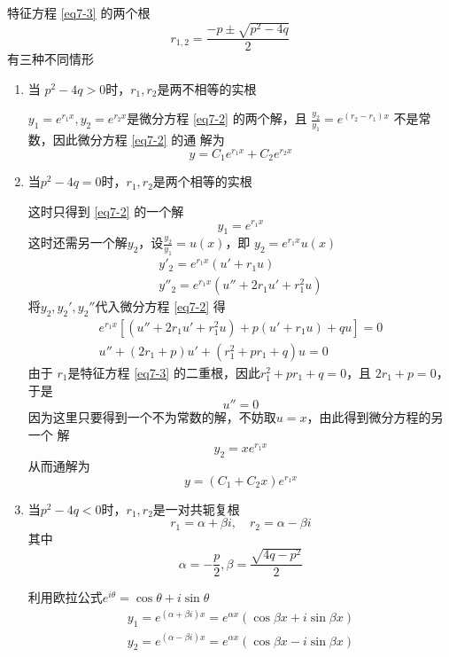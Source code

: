 \documentclass[11pt]{article}
\begin{document}
特征方程 \eqref{eq7-3} 的两个根
\begin{equation*}
r_{1,2}=\frac{-p\pm\sqrt{p^2-4q}}{2}
\end{equation*}
有三种不同情形
\begin{enumerate}
\item 当 \(p^2-4q>0\)时，\(r_1,r_2\)是两不相等的实根

\(y_1=e^{r_1x},y_2=e^{r_2x}\)是微分方程 \eqref{eq7-2} 的两个解，且
\(\frac{y_2}{y_1}=e^{(r_2-r_1)x}\) 不是常数，因此微分方程 \eqref{eq7-2} 的通
解为
\begin{equation*}
y=C_1e^{r_1x}+C_2e^{r_2x}
\end{equation*}
\item 当\(p^2-4q=0\)时，\(r_1,r_2\)是两个相等的实根

这时只得到 \eqref{eq7-2} 的一个解
\begin{equation*}
y_1=e^{r_1x}
\end{equation*}
这时还需另一个解\(y_2\)，设\(\frac{y_2}{y_1}=u(x)\)，即
\(y_2=e^{r_1x}u(x)\)
\begin{gather*}
y'_2=e^{r_1x}(u'+r_1u)\\
y''_2=e^{r_1x}(u''+2r_1u'+r_1^2u)
\end{gather*}
将\(y_2,y_2',y_2''\)代入微分方程 \eqref{eq7-2} 得
\begin{gather*}
e^{r_1x}[(u''+2r_1u'+r_1^2u)+p(u'+r_1u)+qu]=0\\
u''+(2r_1+p)u'+(r_1^2+pr_1+q)u=0
\end{gather*}
由于 \(r_1\)是特征方程 \eqref{eq7-3} 的二重根，因此\(r_1^2+pr_1+q=0\)，且
\(2r_1+p=0\)，于是
\begin{equation*}
u''=0
\end{equation*}
因为这里只要得到一个不为常数的解，不妨取\(u=x\)，由此得到微分方程的另一个
解
\begin{equation*}
y_2=xe^{r_1x}
\end{equation*}
从而通解为
\begin{equation*}
y=(C_1+C_2x)e^{r_1x}
\end{equation*}
\item 当\(p^2-4q<0\)时，\(r_1,r_2\)是一对共轭复根
\begin{equation*}
r_1=\alpha+\beta i,\quad r_2=\alpha-\beta i
\end{equation*}
其中
\begin{equation*}
\alpha=-\frac{p}{2},\beta=\frac{\sqrt{4q-p^2}}{2}
\end{equation*}

利用欧拉公式\(e^{i\theta}=\cos\theta+i\sin\theta\)
\begin{gather*}
y_1=e^{(\alpha+\beta i)x}=e^{\alpha x}(\cos\beta x+i\sin\beta x)\\
y_2=e^{(\alpha-\beta i)x}=e^{\alpha x}(\cos\beta x-i\sin\beta x)
\end{gather*}


\end{enumerate}
\end{document}
